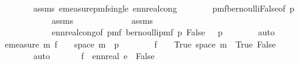 \begin{isabellebody}
\ \ \ \ \ \ \isamarkupfalse%
\ assms{\isacharparenleft}{\kern0pt}{}{\isacharparenright}{\kern0pt}\ emeasure{\isacharunderscore}{\kern0pt}pmf{\isacharunderscore}{\kern0pt}single\ ennreal{\isacharunderscore}{\kern0pt}cong\isanewline
\ \ \ \ \ \ \isamarkupfalse%
\ pmf{\isacharunderscore}{\kern0pt}bernoulli{\isacharunderscore}{\kern0pt}False{\isacharbrackleft}{\kern0pt}of\ p{}{\isacharbrackright}{\kern0pt}\isanewline
\ \ \ \ \ \ \ \ \ \ \ \ assms{\isacharparenleft}{\kern0pt}{}{\isacharparenright}{\kern0pt}\ \isanewline
\ \ \ \ \ \ \ \ \ \ \ \ assms{\isacharparenleft}{\kern0pt}{}{\isacharparenright}{\kern0pt}\ \isanewline
\ \ \ \ \ \ \ \ \ \ \ \ ennreal{\isacharunderscore}{\kern0pt}cong{\isacharbrackleft}{\kern0pt}of\ {\isachardoublequoteopen}pmf\ {\isacharparenleft}{\kern0pt}bernoulli{\isacharunderscore}{\kern0pt}pmf\ p{}{\isacharparenright}{\kern0pt}\ False{\isachardoublequoteclose}\ {\isachardoublequoteopen}{}\ {\isacharminus}{\kern0pt}\ p{}{\isachardoublequoteclose}{\isacharbrackright}{\kern0pt}\isanewline
\ \ \ \ \ \ \isamarkupfalse%
\ auto\isanewline
\ \ \ \ \isamarkupfalse%
\ \isamarkupfalse%
\ {\isachardoublequoteopen}emeasure\ m\ {\isacharparenleft}{\kern0pt}f\ {\isacharminus}{\kern0pt}{\isacharbackquote}{\kern0pt}\ {\isacharbraceleft}{\kern0pt}{}{\isacharbraceright}{\kern0pt}\ {\isasyminter}\ space\ m{\isacharparenright}{\kern0pt}\ {\isacharequal}{\kern0pt}\ p{}{\isachardoublequoteclose}\isanewline
\ \ \ \ \ \ \isamarkupfalse%
\ {\isacartoucheopen}f\ {\isacharminus}{\kern0pt}{\isacharbackquote}{\kern0pt}\ {\isacharbraceleft}{\kern0pt}{}{\isacharbraceright}{\kern0pt}\ {\isacharequal}{\kern0pt}\ {\isacharbraceleft}{\kern0pt}True{\isacharbraceright}{\kern0pt}{\isacartoucheclose}\ {\isacartoucheopen}space\ m\ {\isacharequal}{\kern0pt}\ {\isacharbraceleft}{\kern0pt}True{\isacharcomma}{\kern0pt}\ False{\isacharbraceright}{\kern0pt}{\isacartoucheclose}\ \isanewline
\ \ \ \ \ \ \isamarkupfalse%
\ auto\ \isanewline
\ \ \ \ \isamarkupfalse%
\ {\isachardoublequoteopen}f\ {\isacharminus}{\kern0pt}{\isacharbackquote}{\kern0pt}\ {\isacharbraceleft}{\kern0pt}ennreal\ e{\isacharbraceright}{\kern0pt}\ {\isacharequal}{\kern0pt}\ {\isacharbraceleft}{\kern0pt}False{\isacharbraceright}{\kern0pt}{\isachardoublequoteclose}\isanewline
\ \ \ \ \isamarkupfalse%
\isanewline
\ \ \ \ \ \ \isamarkupfalse%

\end{isabellebody}
